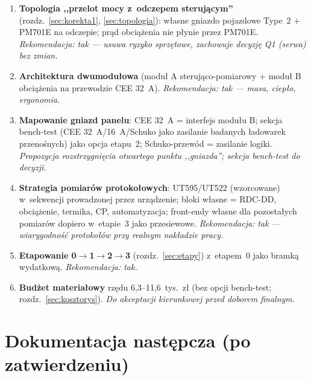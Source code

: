 \documentclass[11pt,a4paper]{article}
\begin{document}
\begin{enumerate}[label=\textbf{Z\arabic*.}]
\item \textbf{Topologia ,,przelot mocy z~odczepem sterującym''} (rozdz.~\ref{sec:korekta1}, \ref{sec:topologia}): własne gniazdo pojazdowe Type~2 + PM701E na odczepie; prąd obciążenia nie płynie przez PM701E. \emph{Rekomendacja: tak --- usuwa ryzyko sprzętowe, zachowuje decyzję Q1 (serwa) bez zmian.}
\item \textbf{Architektura dwumodułowa} (moduł A sterująco-pomiarowy + moduł B obciążenia na przewodzie CEE 32~A). \emph{Rekomendacja: tak --- masa, ciepło, ergonomia.}
\item \textbf{Mapowanie gniazd panelu}: CEE 32~A = interfejs modułu B; sekcja bench-test (CEE 32~A/16~A/Schuko jako zasilanie badanych ładowarek przenośnych) jako opcja etapu~2; Schuko-przewód = zasilanie logiki. \emph{Propozycja rozstrzygnięcia otwartego punktu ,,gniazda''; sekcja bench-test do decyzji.}
\item \textbf{Strategia pomiarów protokołowych}: UT595/UT522 (wzorcowane) w~sekwencji prowadzonej przez urządzenie; bloki własne = RDC-DD, obciążenie, termika, CP, automatyzacja; front-endy własne dla pozostałych pomiarów dopiero w~etapie~3 jako przesiewowe. \emph{Rekomendacja: tak --- wiarygodność protokołów przy realnym nakładzie pracy.}
\item \textbf{Etapowanie 0$\rightarrow$1$\rightarrow$2$\rightarrow$3} (rozdz.~\ref{sec:etapy}) z~etapem~0 jako bramką wydatkową. \emph{Rekomendacja: tak.}
\item \textbf{Budżet materiałowy} rzędu 6,3--11,6~tys.~zł (bez opcji bench-test; rozdz.~\ref{sec:kosztorys}). \emph{Do akceptacji kierunkowej przed doborem finalnym.}
\end{enumerate}

\section{Dokumentacja następcza (po zatwierdzeniu)}
\label{sec:dokumentacja}
\end{document}
